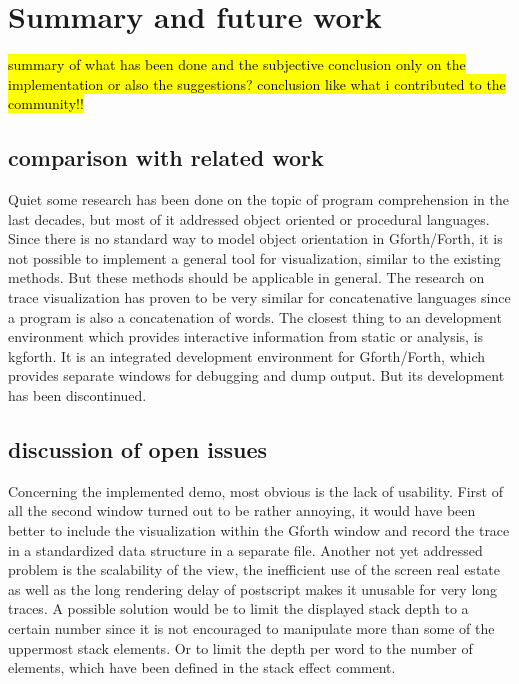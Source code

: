 \chapter{Summary and future work}
\label{chap:Summary}


\hl{summary of what has been done and the subjective conclusion only on the implementation or also the suggestions? conclusion like what i contributed to the community!!\\}

\section{comparison with related work}

Quiet some research has been done on the topic of program comprehension in the last decades, but most of it addressed object oriented or procedural languages. Since there is no standard way to model object orientation in Gforth/Forth, it is not possible to implement a general tool for visualization, similar to the existing methods. But these methods should be applicable in general. The research on trace visualization has proven to be very similar for concatenative languages since a program is also a concatenation of words. The closest thing to an development environment which provides interactive information from static or analysis, is kgforth. It is an integrated development environment for Gforth/Forth, which provides separate windows for debugging and dump output. But its development has been discontinued.

\section{discussion of open issues}

Concerning the implemented demo, most obvious is the lack of usability. First of all the second window turned out to be rather annoying, it would have been better to include the visualization within the Gforth window and record the trace in a standardized data structure in a separate file.
Another not yet addressed problem is the scalability of the view, the inefficient use of the screen real estate as well as the long rendering delay of postscript makes it unusable for very long traces. A possible solution would be to limit the displayed stack depth to a certain number since it is not encouraged to manipulate more than some of the uppermost stack elements. Or to limit the depth per word to the number of elements, which have been defined in the stack effect comment.

